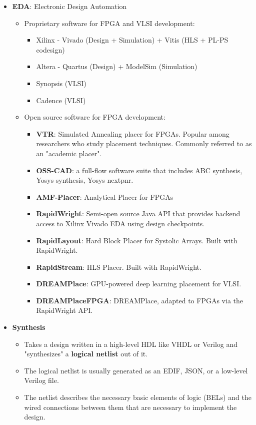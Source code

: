 \documentclass{article}
\begin{document}
\begin{itemize}[label={\textbullet}, left=0.25cm]
        \item \textbf{EDA}: Electronic Design Automation
        \begin{itemize}[label={--}, left=0.25cm]
            \item Proprietary software for FPGA and VLSI development:
            \begin{itemize}[label={$\cdot$}, left=0.25cm]
                \item Xilinx - Vivado (Design + Simulation) + Vitis (HLS + PL-PS codesign)
                \item Altera - Quartus (Design) + ModelSim (Simulation)
                \item Synopsis (VLSI)
                \item Cadence (VLSI)
            \end{itemize}
            \item Open source software for FPGA development:
            \begin{itemize}[label={$\cdot$}, left=0.25cm]
                \item \textbf{VTR}: Simulated Annealing placer for FPGAs. Popular among researchers who study placement techniques. 
                    Commonly referred to as an "academic placer".
                \item \textbf{OSS-CAD}: a full-flow software suite that includes ABC synthesis, Yosys synthesis, Yosys nextpnr.
                \item \textbf{AMF-Placer}: Analytical Placer for FPGAs
                \item \textbf{RapidWright}: Semi-open source Java API that provides backend access to Xilinx Vivado EDA using design checkpoints.
                \item \textbf{RapidLayout}: Hard Block Placer for Systolic Arrays. Built with RapidWright.
                \item \textbf{RapidStream}: HLS Placer. Built with RapidWright.
                \item \textbf{DREAMPlace}: GPU-powered deep learning placement for VLSI.
                \item \textbf{DREAMPlaceFPGA}: DREAMPlace, adapted to FPGAs via the RapidWright API.
            \end{itemize}
        \end{itemize}
        
        \item \textbf{Synthesis}
        \begin{itemize}[label={--}, left=0.25cm]
            \item Takes a design written in a high-level HDL like VHDL or Verilog and "synthesizes" a \textbf{logical netlist} out of it. 
            \item The logical netlist is usually generated as an EDIF, JSON, or a low-level Verilog file. 
            \item The netlist describes the necessary basic elements of logic (BELs) and the wired connections between them that are necessary to implement the design.
        \end{itemize}


\end{itemize}
\end{document}
